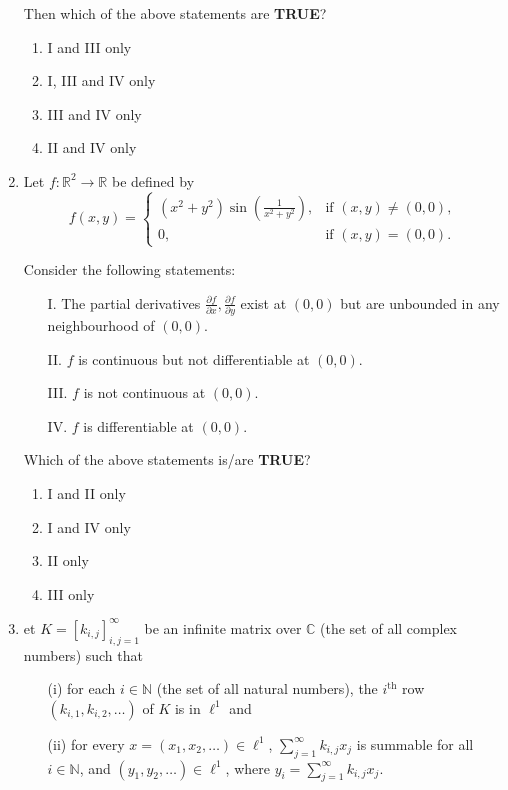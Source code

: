 \documentclass[journal]{IEEEtran}
\begin{document}
\begin{enumerate}
Then which of the above statements are \textbf{TRUE}?

\begin{enumerate}
    \item I and III only
    \item I, III and IV only
    \item III and IV only
    \item II and IV only
\end{enumerate}
\vspace{0.5cm}
\item Let \( f : \mathbb{R}^2 \rightarrow \mathbb{R} \) be defined by
\[
f(x, y) = \begin{cases} 
      (x^2 + y^2) \sin \left( \frac{1}{x^2 + y^2} \right), & \text{if } (x, y) \neq (0,0), \\
      0, & \text{if } (x, y) = (0,0).
   \end{cases}
\]

Consider the following statements:

\begin{itemize}
    \item[I.] The partial derivatives \( \frac{\partial f}{\partial x}, \frac{\partial f}{\partial y} \) exist at \( (0, 0) \) but are unbounded in any neighbourhood of \( (0, 0) \).
    \item[II.] \( f \) is continuous but not differentiable at \( (0, 0) \).
    \item[III.] \( f \) is not continuous at \( (0, 0) \).
    \item[IV.] \( f \) is differentiable at \( (0, 0) \).
\end{itemize}

Which of the above statements is/are \textbf{TRUE}?

\begin{enumerate}
    \item I and II only
    \item I and IV only
    \item II only
    \item III only
\end{enumerate}
\vspace{0.5cm}
\item et \( K = [k_{i,j}]_{i,j=1}^{\infty} \) be an infinite matrix over \( \mathbb{C} \) (the set of all complex numbers) such that
\begin{itemize}
    \item[(i)] for each \( i \in \mathbb{N} \) (the set of all natural numbers), the \( i^{\text{th}} \) row \( (k_{i,1}, k_{i,2}, \dots) \) of \( K \) is in \( \ell^1 \) and
    \item[(ii)] for every \( x = (x_1, x_2, \dots) \in \ell^1 \), \( \sum_{j=1}^{\infty} k_{i,j} x_j \) is summable for all \( i \in \mathbb{N} \), and \( (y_1, y_2, \dots) \in \ell^1 \), where \( y_i = \sum_{j=1}^{\infty} k_{i,j} x_j \).
\end{itemize}


\end{enumerate}
\end{document}
